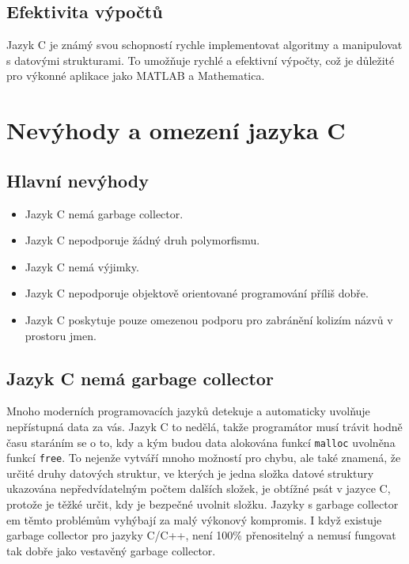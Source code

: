 \documentclass{article}
\begin{document}
	\subsection*{Efektivita výpočtů}
	Jazyk C je známý svou schopností rychle implementovat algoritmy a manipulovat s datovými strukturami. To umožňuje rychlé a efektivní výpočty, což je důležité pro výkonné aplikace jako MATLAB a Mathematica.
	


	
	
	\section*{Nevýhody a omezení jazyka C}
	
	\subsection*{Hlavní nevýhody}
	
	\begin{itemize}
		\item Jazyk C nemá garbage collector.
		\item Jazyk C nepodporuje žádný druh polymorfismu.
		\item Jazyk C nemá výjimky.
		\item Jazyk C nepodporuje objektově orientované programování příliš dobře.
		\item Jazyk C poskytuje pouze omezenou podporu pro zabránění kolizím názvů v prostoru jmen.
	\end{itemize}
	
	\subsection*{Jazyk C nemá garbage collector}
	
	Mnoho moderních programovacích jazyků detekuje a automaticky uvolňuje nepřístupná data za vás. Jazyk C to nedělá, takže programátor musí trávit hodně času staráním se o to, kdy a kým budou data alokována funkcí \texttt{malloc} uvolněna funkcí \texttt{free}. To nejenže vytváří mnoho možností pro chybu, ale také znamená, že určité druhy datových struktur, ve kterých je jedna složka datové struktury ukazována nepředvídatelným počtem dalších složek, je obtížné psát v jazyce C, protože je těžké určit, kdy je bezpečné uvolnit složku. Jazyky s garbage collector em těmto problémům vyhýbají za malý výkonový kompromis. I když existuje garbage collector pro jazyky C/C++, není 100\% přenositelný a nemusí fungovat tak dobře jako vestavěný garbage collector.
	
\end{document}
